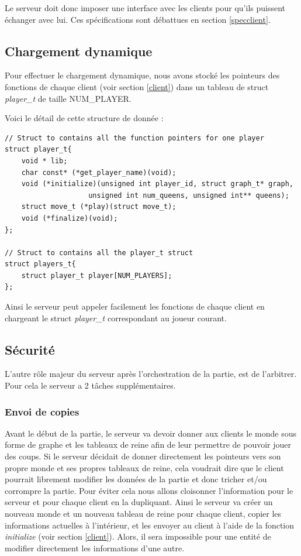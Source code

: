 \documentclass{article}
\begin{document}
Le serveur doit donc imposer une interface avec les clients pour qu'ils puissent échanger avec lui. Ces spécifications sont débattues en section \ref{specclient}.

\subsection{Chargement dynamique}
\label{chargdyn}
Pour effectuer le chargement dynamique, nous avons stocké les pointeurs des fonctions de chaque client (voir section \ref{client}) dans un tableau de struct \textit{player\_t} de taille NUM\_PLAYER.
\vspace{0.5cm}

\noindent Voici le détail de cette structure de donnée :
\begin{lstlisting}
// Struct to contains all the function pointers for one player
struct player_t{
    void * lib;
    char const* (*get_player_name)(void);
    void (*initialize)(unsigned int player_id, struct graph_t* graph,
                    unsigned int num_queens, unsigned int** queens);
    struct move_t (*play)(struct move_t);
    void (*finalize)(void);
};

// Struct to contains all the player_t struct
struct players_t{
    struct player_t player[NUM_PLAYERS];
};
\end{lstlisting}

\noindent Ainsi le serveur peut appeler facilement les fonctions de chaque client en chargeant le struct \textit{player\_t} correspondant au  joueur courant.

\subsection{Sécurité}
\label{secu}

L'autre rôle majeur du serveur après l'orchestration de la partie, est de l'arbitrer. Pour cela le serveur a 2 tâches supplémentaires.

\subsubsection{Envoi de copies}

Avant le début de la partie, le serveur va devoir donner aux clients le monde sous forme de graphe et les tableaux de reine afin de leur permettre de pouvoir jouer des coups. Si le serveur décidait de donner directement les pointeurs vers son propre monde et ses propres tableaux de reine, cela voudrait dire que le client pourrait librement modifier les données de la partie et donc tricher et/ou corrompre la partie. Pour éviter cela nous allons cloisonner l'information pour le serveur et pour chaque client en la dupliquant. Ainsi le serveur va créer un nouveau monde et un nouveau tableau de reine pour chaque client, copier les informations actuelles à l'intérieur, et les envoyer au client à l'aide de la fonction \textit{initialize} (voir section \ref{client}). Alors, il sera impossible pour une entité de modifier directement les informations d'une autre.
\end{document}
